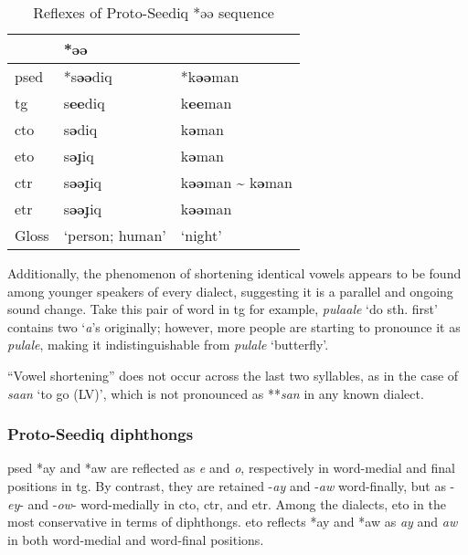 \begin{table}[!htbp]
\centering
\caption{Reflexes of Proto-Seediq *əə sequence}
\label{tab:psed_VxVx}
\begin{tabular}{lll}
\hline
           & \multicolumn{2}{l}{*əə} \\ \hline
\acs{psed} & *s\textbf{əə}diq       & *k\textbf{əə}man            \\ \hdashline
\acs{tg}   & s\textbf{ee}diq        & k\textbf{ee}man             \\
\acs{cto}  & s\textbf{ə}diq         & k\textbf{ə}man              \\
\acs{eto}  & s\textbf{ə}ɟiq         & k\textbf{ə}man                    \\
\acs{ctr}  & s\textbf{əə}ɟiq        & k\textbf{əə}man \~{} k\textbf{ə}man              \\
\acs{etr}  & s\textbf{əə}ɟiq        & k\textbf{əə}man         \\ \hline
Gloss      & `person; human'       & `night'      \\ \hline
\end{tabular}
\end{table}

Additionally, the phenomenon of shortening identical vowels appears to be found among younger speakers of every dialect, suggesting it is a parallel and ongoing sound change. Take this pair of word in \acl{tg} for example, \textit{pulaale} `do sth. first' contains two `\textit{a}'s originally; however, more people are starting to pronounce it as \textit{pulale}, making it indistinguishable from \textit{pulale} `butterfly'.

``Vowel shortening'' does not occur across the last two syllables, as in the case of \textit{saan} `to go (LV)', which is not pronounced as **\textit{san} in any known dialect.

\subsubsection{Proto-Seediq diphthongs}

\acl{psed} *ay and *aw are reflected as \textit{e} and \textit{o}, respectively in word-medial and final positions in \acl{tg}. By contrast, they are retained -\textit{ay} and -\textit{aw} word-finally, but as -\textit{ey}- and -\textit{ow}- word-medially in \acl{cto}, \acl{ctr}, and \acl{etr}. Among the dialects, \acl{eto} in the most conservative in terms of diphthongs. \acl{eto} reflects *ay and *aw as \textit{ay} and \textit{aw} in both word-medial and word-final positions. 

